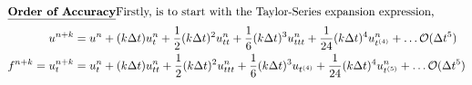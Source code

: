 \begin{enumerate}[label=\alph*., start = 1]
    \vspace{-0.25in}
    \begin{align*}
        \shortintertext{\textbf{\underline{Order of Accuracy}}\newline Firstly, is to start with the Taylor-Series expansion expression,}
        u^{n+k} & = u^n + (k\Delta t)u_t^n + \frac{1}{2}(k\Delta t)^2u_{tt}^n + \frac{1}{6}(k\Delta t)^3u_{ttt}^n + \frac{1}{24}(k\Delta t)^4u_{t^{(4)}}^n + \ldots \mathcal{O}(\Delta t^5)\\
        f^{n+k} = u_t^{n+k} & = u_t^n + (k\Delta t)u_{tt}^n + \frac{1}{2}(k\Delta t)^2u_{ttt}^n + \frac{1}{6}(k\Delta t)^3u_{t^{(4)}} + \frac{1}{24}(k\Delta t)^4u_{t^{(5)}}^n + \ldots \mathcal{O}(\Delta t^5)
    \end{align*}
\end{enumerate}

\pagebreak
\pagestyle{fancy}
\restoregeometry

